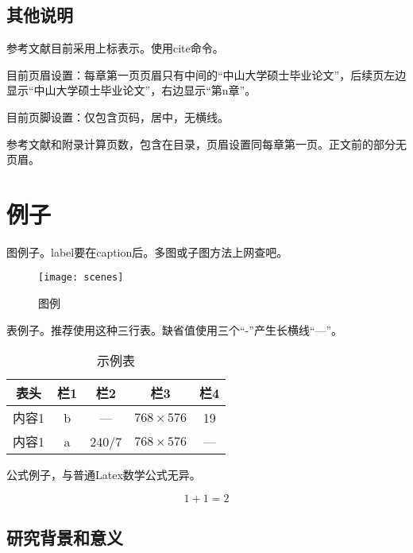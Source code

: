 \subsection{其他说明}
\label{sec:setting}

参考文献\cite{wu2013online}目前采用上标表示。使用cite命令。

目前页眉设置：每章第一页页眉只有中间的“中山大学硕士毕业论文”，后续页左边显示“中山大学硕士毕业论文”，右边显示“第n章”。

目前页脚设置：仅包含页码，居中，无横线。

参考文献和附录计算页数，包含在目录，页眉设置同每章第一页。正文前的部分无页眉。

\section{例子}
\label{sec:examples}

图例子。label要在caption后。多图或子图方法上网查吧。

\begin{figure}[!t]
	\centering
	\texttt{[image: scenes]}
	\caption{图例}
	\label{fig:scenes}
\end{figure}

表例子。推荐使用这种三行表。缺省值使用三个“-”产生长横线“---”。

\begin{table}[!t]
\caption{示例表}
\label{tab:eg}
\vspace{0.5em}
\centering
\wuhao
	\begin{tabular}{ccccc}
	\toprule[1.5pt]
	表头 & 栏1 & 栏2 & 栏3 & 栏4 \\
	\midrule[1pt]
	内容1 & b & --- & $768 \times 576$ & 19 \\
	内容1 & a & 240/7 & $768 \times 576$ & --- \\
	\bottomrule[1.5pt]
	\end{tabular}
\end{table}

公式例子，与普通Latex数学公式无异。

\begin{equation}
1+1=2
\end{equation}

\subsection{研究背景和意义}

